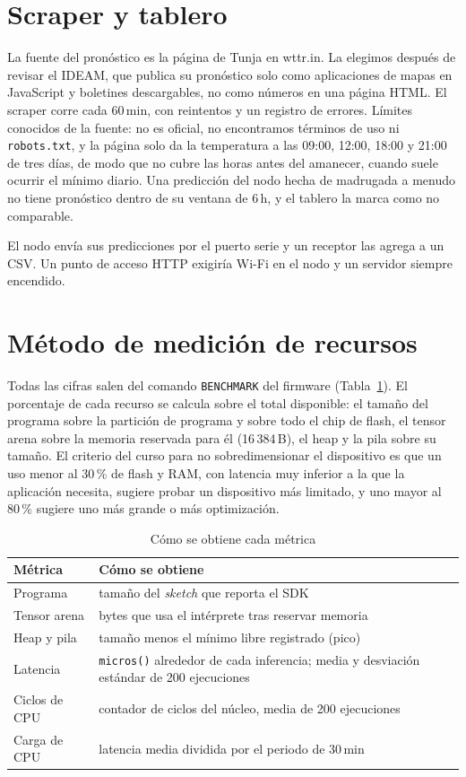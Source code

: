 \documentclass[conference]{IEEEtran}
\begin{document}
\section{Scraper y tablero}
La fuente del pron\'ostico es la p\'agina de Tunja en wttr.in. La elegimos despu\'es de revisar el IDEAM, que publica su pron\'ostico solo como aplicaciones de mapas en JavaScript y boletines descargables, no como n\'umeros en una p\'agina HTML. El scraper corre cada 60\,min, con reintentos y un registro de errores. L\'imites conocidos de la fuente: no es oficial, no encontramos t\'erminos de uso ni \texttt{robots.txt}, y la p\'agina solo da la temperatura a las 09:00, 12:00, 18:00 y 21:00 de tres d\'ias, de modo que no cubre las horas antes del amanecer, cuando suele ocurrir el m\'inimo diario. Una predicci\'on del nodo hecha de madrugada a menudo no tiene pron\'ostico dentro de su ventana de 6\,h, y el tablero la marca como no comparable.

El nodo env\'ia sus predicciones por el puerto serie y un receptor las agrega a un CSV. Un punto de acceso HTTP exigir\'ia Wi-Fi en el nodo y un servidor siempre encendido.

\section{M\'etodo de medici\'on de recursos}
Todas las cifras salen del comando \texttt{BENCHMARK} del firmware (Tabla~\ref{tab:met}). El porcentaje de cada recurso se calcula sobre el total disponible: el tama\~no del programa sobre la partici\'on de programa y sobre todo el chip de flash, el tensor arena sobre la memoria reservada para \'el (16\,384\,B), el heap y la pila sobre su tama\~no. El criterio del curso para no sobredimensionar el dispositivo es que un uso menor al 30\,\% de flash y RAM, con latencia muy inferior a la que la aplicaci\'on necesita, sugiere probar un dispositivo m\'as limitado, y uno mayor al 80\,\% sugiere uno m\'as grande o m\'as optimizaci\'on.

\begin{table}[t]
\caption{C\'omo se obtiene cada m\'etrica}
\label{tab:met}
\centering
\small
\begin{tabular}{@{}>{\raggedright}p{2.3cm}>{\raggedright\arraybackslash}p{5.3cm}@{}}
\toprule
M\'etrica & C\'omo se obtiene \\
\midrule
Programa & tama\~no del \textit{sketch} que reporta el SDK \\
Tensor arena & bytes que usa el int\'erprete tras reservar memoria \\
Heap y pila & tama\~no menos el m\'inimo libre registrado (pico) \\
Latencia & \texttt{micros()} alrededor de cada inferencia; media y desviaci\'on est\'andar de 200 ejecuciones \\
Ciclos de CPU & contador de ciclos del n\'ucleo, media de 200 ejecuciones \\
Carga de CPU & latencia media dividida por el periodo de 30\,min \\
\bottomrule
\end{tabular}
\end{table}
\end{document}
